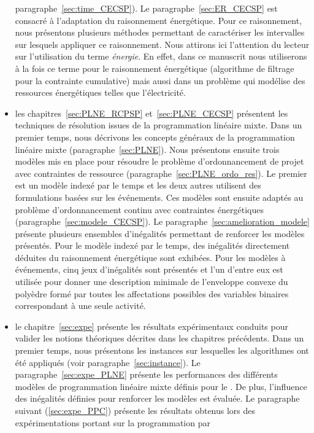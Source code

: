 \begin{itemize}
  paragraphe~\ref{sec:time_CECSP}). Le paragraphe~\ref{sec:ER_CECSP} est
  consacré à l'adaptation du raisonnement énergétique. Pour ce
  raisonnement, nous présentons plusieurs méthodes permettant de
  caractériser les intervalles sur lesquels appliquer ce
  raisonnement. Nous attirons ici l'attention du lecteur sur
  l'utilisation du terme {\it énergie}. En effet, dans ce manuscrit
  nous utiliserons à la fois ce terme pour le raisonnement
  énergétique (algorithme de filtrage pour la contrainte cumulative)
  mais aussi dans un problème qui modélise des ressources énergétiques
  telles que l'électricité.
\item les chapitres~\ref{sec:PLNE_RCPSP} et~\ref{sec:PLNE_CECSP}
  présentent les techniques de résolution issues de la programmation
  linéaire mixte. Dans un premier temps, nous décrivons les concepts généraux
  de la programmation linéaire mixte (paragraphe~\ref{sec:PLNE}). Nous
  présentons ensuite trois modèles mis en place pour
  résoudre le problème d'ordonnancement de projet avec contraintes de
  ressource (paragraphe~\ref{sec:PLNE_ordo_res}). Le premier est un
  modèle indexé par le temps et les deux autres utilisent des
  formulations basées sur les événements. Ces modèles sont
  ensuite adaptés au problème d'ordonnancement continu
avec contraintes énergétiques (paragraphe~\ref{sec:modele_CECSP}). Le
paragraphe~\ref{sec:amelioration_modele} présente plusieurs
ensembles d'inégalités permettant de renforcer les modèles
présentés. Pour le modèle indexé par le temps, des inégalités
directement déduites du raisonnement énergétique sont exhibées. Pour
les modèles à événements, cinq jeux d'inégalités sont présentés et
l'un d'entre eux est utilisée pour donner une description minimale de
l'enveloppe convexe du polyèdre formé par toutes les affectations
possibles des variables binaires correspondant à une seule activité.
\item le chapitre~\ref{sec:expe} présente les résultats expérimentaux
  conduits pour valider les notions théoriques décrites dans les
  chapitres précédents. Dans un premier temps, nous présentons les
  instances sur lesquelles les algorithmes ont été appliqués (voir
  paragraphe~\ref{sec:instance}). Le paragraphe~\ref{sec:expe_PLNE}
  présente les performances des différents modèles de programmation
  linéaire mixte définis pour le \CECSP. De plus, l'influence des 
  inégalités définies pour renforcer les modèles est évaluée. Le
  paragraphe suivant (\ref{sec:expe_PPC}) présente les résultats obtenus
  lors des expérimentations portant sur la programmation par

\end{itemize}
